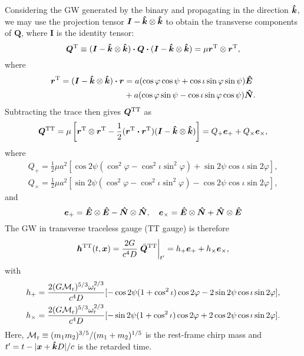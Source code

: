 \documentclass[times,tight]{aastex631}
\begin{document}
Considering the GW generated by the binary and propagating in the direction $\vu*{k}$, we may use the projection tensor $\bm{I} - \vu*{k} \otimes \vu*{k}$ to obtain the transverse components of $\bm{Q}$,
where $\bm{I}$ is the identity tensor:
\begin{equation}
    \bm{Q}^{\rm T} \equiv (\bm{I} - \vu*{k} \otimes \vu*{k}) \vdot \bm{Q} \vdot (\bm{I} - \vu*{k} \otimes \vu*{k}) = \mu\bm{r}^{\rm T} \otimes \bm{r}^{\rm T},
\end{equation}
where
\begin{align}
    \bm{r}^{\rm T} 
    = (\bm{I} - \vu*{k} \otimes \vu*{k}) \vdot \bm{r} 
    &= a(\cos\varphi\cos\psi + \cos\iota \sin\varphi\sin\psi)\vu*{E} \nonumber \\
    &+ a(\cos\varphi\sin\psi - \cos\iota \sin\varphi\cos\psi)\vu*{N}.
\end{align}
Subtracting the trace then gives $\bm{Q}^{\rm TT}$ as
\begin{equation}
    \bm{Q}^{\rm TT}
    = \mu\left[\bm{r}^{\rm T} \otimes \bm{r}^{\rm T}  - \frac{1}{2}(\bm{r}^{\rm T} \vdot \bm{r}^{\rm T})(\bm{I} - \vu*{k} \otimes \vu*{k}) \right]= Q_+ \bm{e}_+ + Q_{\times} \bm{e}_{\times},
\end{equation}
where
\begin{align}
    Q_+ = \frac{1}{2}\mu a^2 [\cos2\psi(\cos^2\varphi - \cos^2\iota \sin^2 \varphi)  + \sin2\psi \cos\iota \sin 2\varphi], \\
    Q_{\times} = \frac{1}{2}\mu a^2 [\sin2\psi(\cos^2\varphi - \cos^2\iota \sin^2 \varphi) - \cos2\psi \cos\iota \sin 2\varphi ], 
\end{align}
and
\begin{equation}
    \bm{e}_+ = \vu*{E}\otimes\vu*{E} - \vu*{N}\otimes\vu*{N} \qc 
    \bm{e}_{\times} = \vu*{E}\otimes\vu*{N} + \vu*{N}\otimes\vu*{E}
\end{equation}
The GW in transverse traceless gauge (TT gauge) is therefore \citep{misner1973}
\begin{equation}\label{eq:gw}
    \bm{h}^{\rm TT}(t,\bm{x}) = \frac{2G}{c^4D} \eval{\ddot{\bm{Q}}^{\rm TT}}_{t^{\prime}} = h_+ \bm{e}_+ + h_{\times} \bm{e}_{\times},
\end{equation}
with
\begin{align}\label{eq:gw_comp}
    h_+ = \frac{2 (G\mathcal{M}_{\rm r})^{5/3} \omega_{\rm r}^{2/3}}{c^4D} [-\cos2\psi(1+\cos^2\iota)\cos2\varphi - 2\sin2\psi \cos\iota \sin 2\varphi],
    \nonumber \\
    h_{\times} = \frac{2 (G\mathcal{M}_{\rm r})^{5/3} \omega_{\rm r}^{2/3}}{c^4D} [-\sin2\psi(1+\cos^2\iota)\cos2\varphi + 2\cos2\psi \cos\iota \sin 2\varphi].
\end{align}
Here, $\mathcal{M}_{\rm r} \equiv (m_1m_2)^{3/5}/(m_1+m_2)^{1/5}$ is the rest-frame chirp mass and $t^{\prime} = t - |\bm{x}+\vu*{k}D|/c$ is the retarded time.
\end{document}
